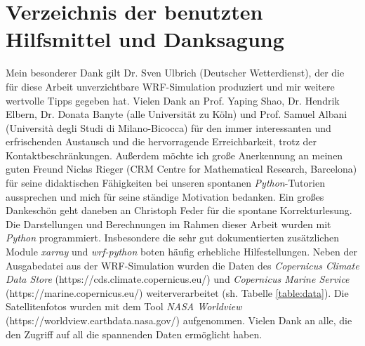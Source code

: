 \documentclass[12pt,a4paper,onecolumn,headheight=30pt]{scrartcl}
\begin{document}
\section{Verzeichnis der benutzten Hilfsmittel und Danksagung}
Mein besonderer Dank gilt Dr. Sven Ulbrich (Deutscher Wetterdienst), der die für diese Arbeit unverzichtbare WRF-Simulation \glqq produziert\grqq{} und mir weitere wertvolle Tipps gegeben hat. Vielen Dank an Prof. Yaping Shao, Dr. Hendrik Elbern, Dr. Donata Banyte (alle Universität zu Köln) und Prof. Samuel Albani (Università degli Studi di Milano-Bicocca) für den immer interessanten und erfrischenden Austausch und die hervorragende Erreichbarkeit, trotz der Kontaktbeschränkungen. Außerdem möchte ich große Anerkennung an meinen guten Freund Niclas Rieger (CRM Centre for Mathematical Research, Barcelona) für seine didaktischen Fähigkeiten bei unseren spontanen \textit{Python}-Tutorien aussprechen und mich für seine ständige Motivation bedanken. Ein großes Dankeschön geht daneben an Christoph Feder für die spontane Korrekturlesung. Die Darstellungen und Berechnungen im Rahmen dieser Arbeit wurden mit \textit{Python} programmiert. Insbesondere die sehr gut dokumentierten zusätzlichen Module \textit{xarray} und \textit{wrf-python} boten häufig erhebliche Hilfestellungen. Neben der Ausgabedatei aus der WRF-Simulation wurden die Daten des \textit{Copernicus Climate Data Store} (https://cds.climate.copernicus.eu/) und \textit{Copernicus Marine Service} (https://marine.copernicus.eu/) weiterverarbeitet (sh. Tabelle \ref{table:data}). Die Satellitenfotos wurden mit dem Tool \textit{NASA Worldview} (https://worldview.earthdata.nasa.gov/) aufgenommen. Vielen Dank an alle, die den Zugriff auf all die spannenden Daten ermöglicht haben.
\end{document}
